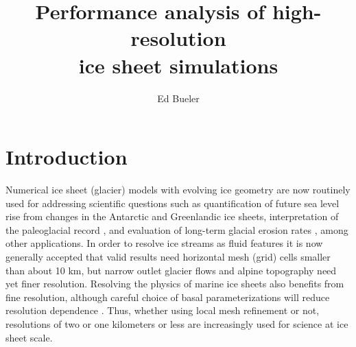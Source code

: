 \documentclass[review]{igs}
\begin{document}
\title[Performance analysis of high-resolution ice sheet simulations]{Performance analysis of high-resolution \\ ice sheet simulations}


\author{Ed Bueler}


\maketitle

\sectionsize

\section{Introduction}

Numerical ice sheet (glacier) models with evolving ice geometry are now routinely used for addressing scientific questions such as quantification of future sea level rise from changes in the Antarctic \citep{Seroussietal2020} and Greenlandic \citep{Goelzeretal2020} ice sheets, interpretation of the paleoglacial record \citep{Weberetal2021}, and evaluation of long-term glacial erosion rates \citep{SeguinotDelaney2021}, among other applications.  In order to resolve ice streams as fluid features it is now generally accepted that valid results need horizontal mesh (grid) cells smaller than about 10 km, but narrow outlet glacier flows and alpine topography need yet finer resolution.  Resolving the physics of marine ice sheets also benefits from fine resolution, although careful choice of basal parameterizations will reduce resolution dependence \citep{Gladstoneetal2017}.  Thus, whether using local mesh refinement \citep[for example]{Fischleretal2022,Hoffmanetal2018} or not, resolutions of two or one kilometers \citep{SeguinotDelaney2021} or less \citep{Aschwandenetal2019,Clarkeetal2015} are increasingly used for science at ice sheet scale.
\end{document}

